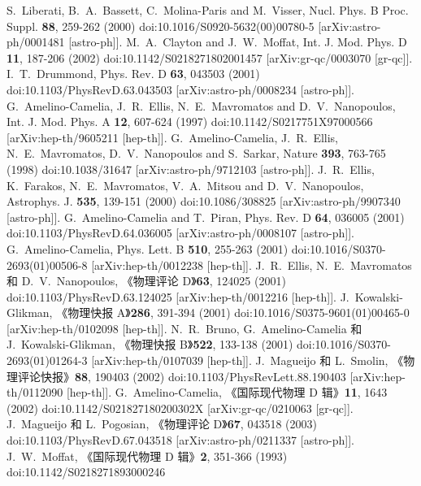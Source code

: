\documentclass[jkps,preprint,fleqn]{revtex4}
\begin{document}
\begin{thebibliography}{999}
S.~Liberati, B.~A.~Bassett, C.~Molina-Paris and M.~Visser,
Nucl. Phys. B Proc. Suppl. \textbf{88}, 259-262 (2000)
doi:10.1016/S0920-5632(00)00780-5
[arXiv:astro-ph/0001481 [astro-ph]].
M.~A.~Clayton and J.~W.~Moffat,
Int. J. Mod. Phys. D \textbf{11}, 187-206 (2002)
doi:10.1142/S0218271802001457
[arXiv:gr-qc/0003070 [gr-qc]].
I.~T.~Drummond,
Phys. Rev. D \textbf{63}, 043503 (2001)
doi:10.1103/PhysRevD.63.043503
[arXiv:astro-ph/0008234 [astro-ph]].
G.~Amelino-Camelia, J.~R.~Ellis, N.~E.~Mavromatos and D.~V.~Nanopoulos,
Int. J. Mod. Phys. A \textbf{12}, 607-624 (1997)
doi:10.1142/S0217751X97000566
[arXiv:hep-th/9605211 [hep-th]].
G.~Amelino-Camelia, J.~R.~Ellis, N.~E.~Mavromatos, D.~V.~Nanopoulos and S.~Sarkar,
Nature \textbf{393}, 763-765 (1998)
doi:10.1038/31647
[arXiv:astro-ph/9712103 [astro-ph]].
J.~R.~Ellis, K.~Farakos, N.~E.~Mavromatos, V.~A.~Mitsou and D.~V.~Nanopoulos,
Astrophys. J. \textbf{535}, 139-151 (2000)
doi:10.1086/308825
[arXiv:astro-ph/9907340 [astro-ph]].
G.~Amelino-Camelia and T.~Piran,
Phys. Rev. D \textbf{64}, 036005 (2001)
doi:10.1103/PhysRevD.64.036005
[arXiv:astro-ph/0008107 [astro-ph]].
G.~Amelino-Camelia,
Phys. Lett. B \textbf{510}, 255-263 (2001)
doi:10.1016/S0370-2693(01)00506-8
[arXiv:hep-th/0012238 [hep-th]].
J.~R.~Ellis, N.~E.~Mavromatos 和 D.~V.~Nanopoulos,
《物理评论 D》\textbf{63}, 124025 (2001)
doi:10.1103/PhysRevD.63.124025
[arXiv:hep-th/0012216 [hep-th]].
J.~Kowalski-Glikman,
《物理快报 A》\textbf{286}, 391-394 (2001)
doi:10.1016/S0375-9601(01)00465-0
[arXiv:hep-th/0102098 [hep-th]].
N.~R.~Bruno, G.~Amelino-Camelia 和 J.~Kowalski-Glikman,
《物理快报 B》\textbf{522}, 133-138 (2001)
doi:10.1016/S0370-2693(01)01264-3
[arXiv:hep-th/0107039 [hep-th]].
J.~Magueijo 和 L.~Smolin,
《物理评论快报》\textbf{88}, 190403 (2002)
doi:10.1103/PhysRevLett.88.190403
[arXiv:hep-th/0112090 [hep-th]].
G.~Amelino-Camelia,
《国际现代物理 D 辑》\textbf{11}, 1643 (2002)
doi:10.1142/S021827180200302X
[arXiv:gr-qc/0210063 [gr-qc]].
J.~Magueijo 和 L.~Pogosian,
《物理评论 D》\textbf{67}, 043518 (2003)
doi:10.1103/PhysRevD.67.043518
[arXiv:astro-ph/0211337 [astro-ph]].
J.~W.~Moffat,
《国际现代物理 D 辑》\textbf{2}, 351-366 (1993)
doi:10.1142/S0218271893000246

\end{thebibliography}
\end{document}
